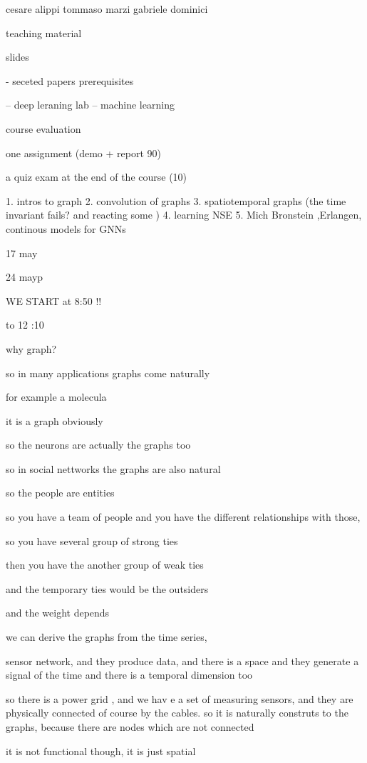 \documentclass{article}
\begin{document}
cesare alippi tommaso marzi gabriele dominici


teaching material 

slides

- seceted papers
prerequisites

-- deep leraning lab
-- machine learning


course evaluation

one assignment (demo + report 90)

a quiz exam at the end of the course (10)


1. intros to graph
2. convolution of graphs
3. spatiotemporal graphs (the time invariant fails? and reacting some )
4. learning NSE
5. Mich Bronstein ,Erlangen,  continous models for GNNs


17 may 

24 mayp


WE START at 8:50 !!

to 12 :10




why graph?


so in many applications graphs come naturally

for example a molecula

it is a graph obviously 

so the neurons are actually the graphs too


so in social nettworks the graphs are also natural


so the people are entities

so you have a team of people and you have the different relationships with those, 


so you have several group of strong ties

then you have the another group of weak ties

and the temporary ties would be the outsiders

and the weight depends


we can derive the graphs from the time series, 

sensor network, and they produce data, and there is a space and they generate a signal of the time and there is a temporal dimension too


so there is a power grid , and we hav e a set of measuring sensors, and they are physically connected of course by the cables. so it is naturally construts to the graphs, because there are nodes which are not connected


it is not functional though, it is just spatial
\end{document}
